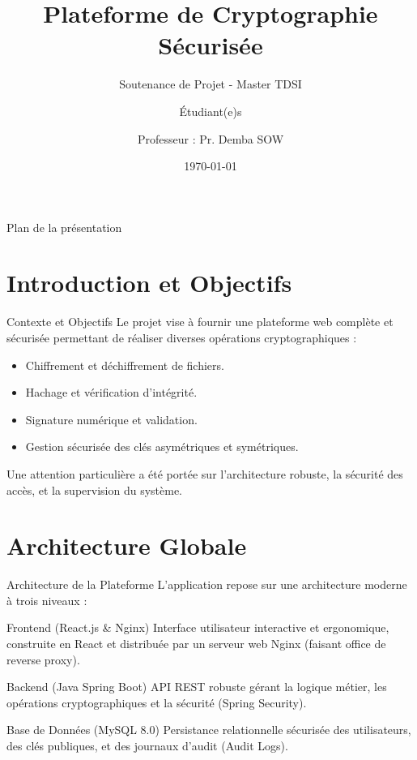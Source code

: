 \documentclass[aspectratio=169,xcolor=dvipsnames]{beamer}
\title[Project Crypto Java]
{
	Plateforme de Cryptographie Sécurisée
}
\subtitle{Soutenance de Projet - Master TDSI}
\author[MTDSI]{Étudiant(e)s \and Professeur : Pr. Demba SOW}
\date{\today}
\begin{document}
\begin{frame}
    \titlepage
\end{frame}

\begin{frame}{Plan de la présentation}
    \tableofcontents
\end{frame}


\section{Introduction et Objectifs}
\begin{frame}{Contexte et Objectifs}
	Le projet vise à fournir une plateforme web complète et sécurisée permettant de réaliser diverses opérations cryptographiques :\\
	\vspace{0.03\textheight} 
	\begin{itemize}
		\item Chiffrement et déchiffrement de fichiers.
		\item Hachage et vérification d'intégrité.
		\item Signature numérique et validation.
		\item Gestion sécurisée des clés asymétriques et symétriques.
	\end{itemize}
	\vspace{0.03\textheight}
	Une attention particulière a été portée sur l'architecture robuste, la sécurité des accès, et la supervision du système.
\end{frame}


\section{Architecture Globale}
\begin{frame}{Architecture de la Plateforme}
	L'application repose sur une architecture moderne à trois niveaux :
	
	\begin{block}{Frontend (React.js \& Nginx)}
		Interface utilisateur interactive et ergonomique, construite en React et distribuée par un serveur web Nginx (faisant office de reverse proxy).
	\end{block}
	
	\begin{alertblock}{Backend (Java Spring Boot)}
		API REST robuste gérant la logique métier, les opérations cryptographiques et la sécurité (Spring Security).
	\end{alertblock}
	
	\begin{examples}{Base de Données (MySQL 8.0)}
		Persistance relationnelle sécurisée des utilisateurs, des clés publiques, et des journaux d'audit (Audit Logs).
	\end{examples}
\end{frame}
\end{document}
